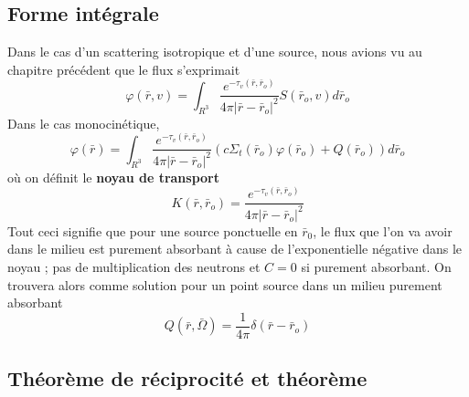 \subsection{Forme intégrale}
Dans le cas d'un scattering isotropique et d'une source, nous avions vu au chapitre précédent que 
le flux s'exprimait
\begin{equation}
\varphi (\bar r,v) = \int_{{R^3}}^{} {\frac{{{e^{ - {\tau _v}(\bar r,{{\bar r}_o})}}}}{{4\pi {{\left| {\bar r - {{\bar r}_o}} \right|}^2}}}} S({\bar r_o},v)d{\bar r_o}
\label{eq:Ch3.cp}
\end{equation}
Dans le cas monocinétique, 
\begin{equation}
\varphi (\bar r) = \int_{{R^3}}^{} {  \frac{{{e^{ - {\tau _v}(\bar r,{{\bar r}_o})}}}}{{4\pi {{\left| {\bar r - {{\bar r}_o}} \right|}^2}}}} (c{\Sigma _t}({\bar r_o})\varphi ({\bar r_o}) + Q({\bar r_o}))d{\bar r_o}
\end{equation}
où on définit le \textbf{noyau de transport}
\begin{equation}
K(\bar r,{\bar r_o}) = \frac{{{e^{ - {\tau _v}(\bar r,{{\bar r}_o})}}}}{{4\pi {{\left| {\bar r - {{\bar r}_o}} \right|}^2}}}
\end{equation}
Tout ceci signifie que pour une source ponctuelle en $\bar r_0$, le flux que l'on va avoir dans le 
milieu est purement absorbant à cause de l'exponentielle négative dans le noyau ; pas de 
multiplication des neutrons et $C=0$ si purement absorbant. On trouvera alors comme solution pour 
un point source dans un milieu purement absorbant
\begin{equation}
Q(\bar r,\bar \Omega ) = \frac{1}{{4\pi }}\delta (\bar r - {\bar r_o})
\end{equation}

\newpage
\subsection{Théorème de réciprocité et théorème}
\ \\

